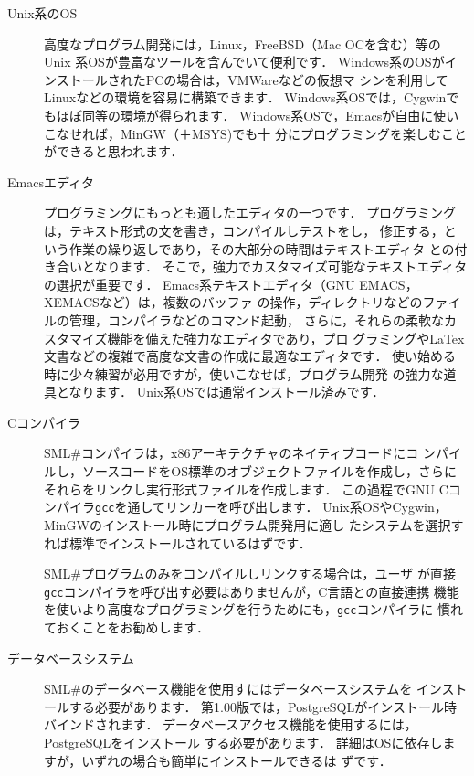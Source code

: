 \documentclass{jbook}
\newcommand{\smlsharp}{SML\#}
\newcommand{\version}{1.00}
\begin{document}
\begin{description}
\item[Unix系のOS] 
	高度なプログラム開発には，Linux，FreeBSD（Mac OCを含む）等のUnix
系OSが豊富なツールを含んでいて便利です．
	Windows系のOSがインストールされたPCの場合は，VMWareなどの仮想マ
シンを利用してLinuxなどの環境を容易に構築できます．
	Windows系OSでは，Cygwinでもほぼ同等の環境が得られます．
	Windows系OSで，Emacsが自由に使いこなせれば，MinGW（＋MSYS)でも十
分にプログラミングを楽しむことができると思われます．
	

\item[Emacsエディタ]
	プログラミングにもっとも適したエディタの一つです．
	プログラミングは，テキスト形式の文を書き，コンパイルしテストをし，
修正する，という作業の繰り返しであり，その大部分の時間はテキストエディタ
との付き合いとなります．
	そこで，強力でカスタマイズ可能なテキストエディタの選択が重要です．
	Emacs系テキストエディタ（GNU EMACS，XEMACSなど）は，複数のバッファ
の操作，ディレクトリなどのファイルの管理，コンパイラなどのコマンド起動，
さらに，それらの柔軟なカスタマイズ機能を備えた強力なエディタであり，プロ
グラミングやLaTex文書などの複雑で高度な文書の作成に最適なエディタです．
	使い始める時に少々練習が必用ですが，使いこなせば，プログラム開発
の強力な道具となります．
	Unix系OSでは通常インストール済みです．

\item[Cコンパイラ] 
	\smlsharp{}コンパイラは，x86アーキテクチャのネイティブコードにコ
ンパイルし，ソースコードをOS標準のオブジェクトファイルを作成し，さらに
それらをリンクし実行形式ファイルを作成します．
	この過程でGNU Cコンパイラ{\tt gcc}を通してリンカーを呼び出します．
	Unix系OSやCygwin，MinGWのインストール時にプログラム開発用に適し
たシステムを選択すれば標準でインストールされているはずです．

	\smlsharp{}プログラムのみをコンパイルしリンクする場合は，ユーザ
が直接{\tt gcc}コンパイラを呼び出す必要はありませんが，C言語との直接連携
機能を使いより高度なプログラミングを行うためにも，{\tt gcc}コンパイラに
慣れておくことをお勧めします．

\item[データベースシステム] 
	\smlsharp{}のデータベース機能を使用すにはデータベースシステムを
インストールする必要があります．
	第\version{}版では，PostgreSQLがインストール時バインドされます．
	データベースアクセス機能を使用するには，PostgreSQLをインストール
する必要があります．
	詳細はOSに依存しますが，いずれの場合も簡単にインストールできるは
ずです．
\end{description}
\end{document}

